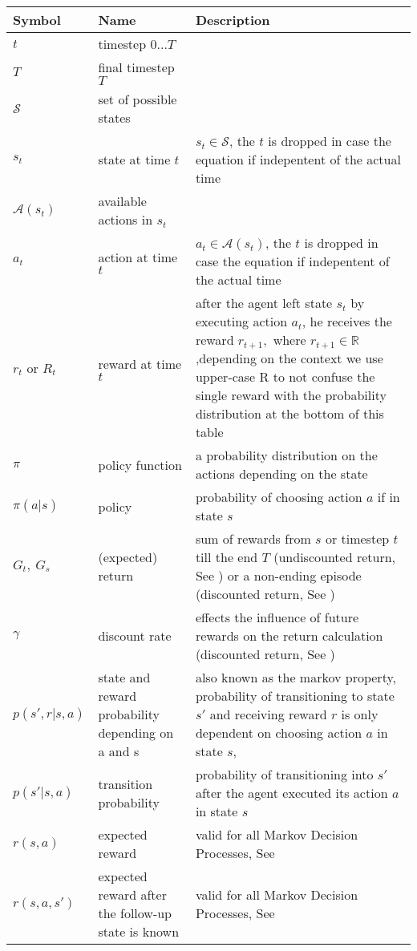 \documentclass[a4paper,12pt]{scrartcl}
\begin{document}
\begin{tabular}{C{0.1\textwidth}p{0.3\textwidth}p{0.6\textwidth}}
	\toprule
	Symbol & Name &  Description \\
	\midrule
	$t$ & timestep $0 \dots T$ & \\
	$T$ & final timestep $T$ & \\
	$\mathcal{S}$ & set of possible states & \\
	$s_t$ & state at time $t$ &  $s_t \in \mathcal{S}$, the $t$ is dropped in case the equation if indepentent of the actual time\\
	$\mathcal{A}(s_t)$ & available actions in $s_t$ & \\
	$a_t$ & action at time $t$ & $a_t \in \mathcal{A}(s_t)$, the $t$ is dropped in case the equation if indepentent of the actual time \\
	$r_t$ or $R_t$ & reward at time $t$ & after the agent left state $s_t$ by executing action $a_t$, he receives the reward $r_{t+1},$ where $r_{t+1} \in \mathbb{R}$,\newline depending on the context we use upper-case R to not confuse the single reward with the probability distribution at the bottom of this table\\
	$\pi$ & policy function & a probability distribution on the actions depending on the state\\
	$\pi(a\vert s)$ & policy & probability of choosing action $a$ if in state $s$\\
	$G_t,~G_s$ & (expected) return & sum of rewards from $s$ or timestep $t$ till the end $T$ (undiscounted return, See ) or a non-ending episode (discounted return, See )\\
	$\gamma$ & discount rate & effects the influence of future rewards on the return calculation (discounted return, See )\\
	$p(s', r|s,a)$ & state and reward probability depending on a and s & also known as the markov property, probability of transitioning to state $s'$ and receiving reward $r$ is only dependent on choosing action $a$ in state $s$, \newline \\
	$p(s'\vert s,a)$ & transition probability & probability of transitioning into $s'$ after the agent executed its action $a$ in state $s$\\
	$r(s,a)$ & expected reward & valid for all Markov Decision Processes, \newline See  \\
	$r(s,a,s')$ & expected reward after the follow-up state is known& valid for all Markov Decision Processes, \newline See  \\
	\bottomrule
\end{tabular}
\end{document}
